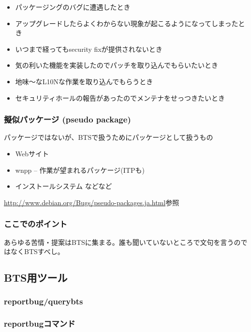 \documentclass[mingoth,a4paper]{jsarticle}
\begin{document}
\begin{itemize}
\item パッケージングのバグに遭遇したとき
\item アップグレードしたらよくわからない現象が起こるようになってしまったとき
\item いつまで経ってもsecurity fixが提供されないとき
\item 気の利いた機能を実装したのでパッチを取り込んでもらいたいとき
\item 地味〜なL10Nな作業を取り込んでもらうとき
\item セキュリティホールの報告があったのでメンテナをせっつきたいとき
\end{itemize}

\subsubsection{擬似パッケージ (pseudo package)}

パッケージではないが、BTSで扱うためにパッケージとして扱うもの

\begin{itemize}
\item Webサイト
\item wnpp -- 作業が望まれるパッケージ(ITPも)
\item インストールシステム	などなど
\end{itemize}

\url{http://www.debian.org/Bugs/pseudo-packages.ja.html}参照

\subsubsection*{ここでのポイント}

あらゆる苦情・提案はBTSに集まる。誰も聞いていないところで文句を言うのではなくBTSすべし。

\subsection{BTS用ツール}

\subsubsection{reportbug/querybts}

\subsubsection*{reportbugコマンド}
\end{document}
